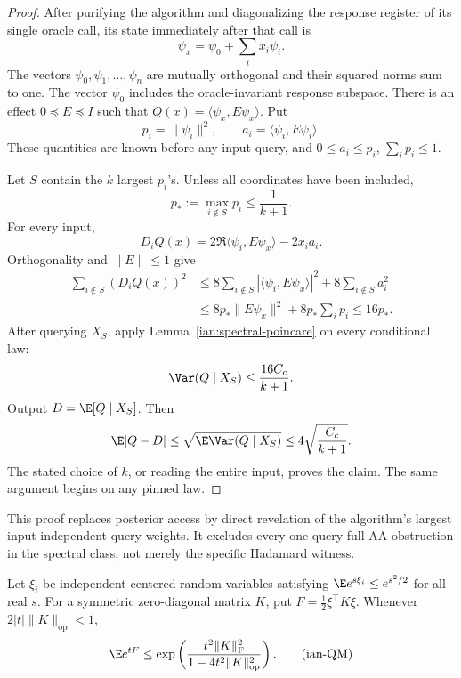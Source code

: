 \begin{proof}
After purifying the algorithm and diagonalizing the response register
of its single oracle call, its state immediately after that call is
\[
 \psi_x=\psi_0+\sum_i x_i\psi_i.
\]
The vectors \(\psi_0,\psi_1,\ldots,\psi_n\) are mutually orthogonal and
their squared norms sum to one. The vector \(\psi_0\) includes the
oracle-invariant response subspace. There is an effect \(0\preceq E\preceq I\)
such that \(Q(x)=\langle\psi_x,E\psi_x\rangle\).
Put
\[
 p_i=\|\psi_i\|^2,\qquad a_i=\langle\psi_i,E\psi_i\rangle.
\]
These quantities are known before any input query, and
\(0\le a_i\le p_i\), \(\sum_i p_i\le1\).

Let \(S\) contain the \(k\) largest \(p_i\)'s. Unless all coordinates
have been included,
\[
 p_*:=\max_{i\notin S}p_i\le\frac1{k+1}.
\]
For every input,
\[
 D_iQ(x)=2\Re\langle\psi_i,E\psi_x\rangle-2x_i a_i.
\]
Orthogonality and \(\|E\|\le1\) give
\[
 \begin{split}
 \sum_{i\notin S}(D_iQ(x))^2
 &\le8\sum_{i\notin S}|\langle\psi_i,E\psi_x\rangle|^2
       +8\sum_{i\notin S}a_i^2\\
 &\le8p_*\|E\psi_x\|^2+8p_*\sum_i p_i
 \le16p_*.
 \end{split}
\]
After querying \(X_S\), apply Lemma~\ref{ian:spectral-poincare} on every
conditional law:
\[
 \Var(Q\mid X_S)\le\frac{16C_c}{k+1}.
\]
Output \(D=\E[Q\mid X_S]\). Then
\[
 \E|Q-D|
 \le\sqrt{\E\Var(Q\mid X_S)}
 \le4\sqrt{\frac{C_c}{k+1}}.
\]
The stated choice of \(k\), or reading the entire input, proves the
claim. The same argument begins on any pinned law.
\end{proof}

This proof replaces posterior access by direct revelation of the
algorithm's largest input-independent query weights. It excludes every
one-query full-AA obstruction in the spectral class, not merely the
specific Hadamard witness.

\begin{lemma}
\label{ian:centered-quadratic-moment}
Let \(\xi_i\) be independent centered random variables satisfying
\(\E e^{s\xi_i}\le e^{s^2/2}\) for all real \(s\).
For a symmetric zero-diagonal matrix \(K\), put
\(F=\frac12\xi^\top K\xi\). Whenever
\(2|t|\|K\|_{\mathrm{op}}<1\),
\[
 \E e^{tF}
 \le
 \exp\left(
 \frac{t^2\|K\|_{\mathrm F}^2}
      {1-4t^2\|K\|_{\mathrm{op}}^2}
 \right).
 \tag{ian-QM}
\]
\end{lemma}

